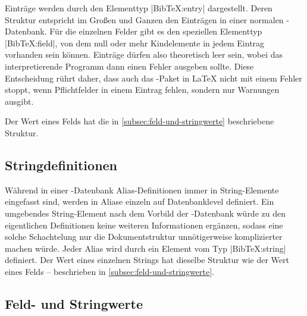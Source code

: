 Einträge werden durch den Elementtyp \lstinlineXML|BibTeX:entry| dargestellt.
Deren Struktur entspricht im Großen und Ganzen den Einträgen in einer normalen
\mbox{\BibTeX-}Datenbank. Für die einzelnen Felder gibt es den speziellen
Elementtyp \lstinlineXML|BibTeX:field|, von dem null oder mehr Kindelemente in
jedem Eintrag vorhanden sein können. Einträge dürfen also theoretisch leer sein,
wobei das interpretierende Programm dann einen Fehler ausgeben sollte. Diese
Entscheidung rührt daher, dass auch das \mbox{-}Paket in \LaTeX{}
nicht mit einem Fehler stoppt, wenn Pflichtfelder in einem Eintrag fehlen,
sondern nur Warnungen ausgibt.

Der Wert eines Felds hat die in \autoref{subsec:feld-und-stringwerte}
beschriebene Struktur.

\subsection{Stringdefinitionen}

Während in einer \mbox{\BibTeX-}Datenbank Alias-Definitionen immer in
String-Elemente eingefasst sind, werden in \BibTeXXML{} Aliase einzeln auf
Datenbanklevel definiert. Ein umgebendes String-Element nach dem Vorbild der
\mbox{\BibTeX-}Datenbank würde zu den eigentlichen Definitionen keine weiteren
Informationen ergänzen, sodass eine solche Schachtelung nur die Dokumentstruktur
unnötigerweise komplizierter machen würde. Jeder Alias wird durch ein Element
vom Typ \lstinlineXML|BibTeX:string| definiert. Der Wert eines einzelnen Strings
hat dieselbe Struktur wie der Wert eines Felds -- beschrieben in
\autoref{subsec:feld-und-stringwerte}.

\subsection{Feld- und Stringwerte}
\label{subsec:feld-und-stringwerte}

